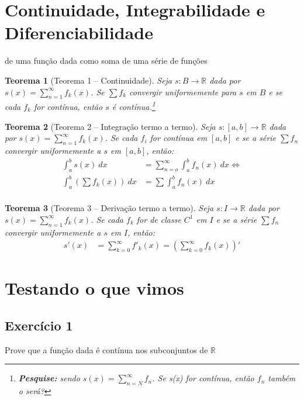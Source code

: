 \documentclass[12pt,openany]{book}
\newtheorem{theorem}{Teorema}[section]
\newcommand{\soma}[2][n]{\sum_{{#1} = #2}^\infty}
\newcommand{\defini}[3][\mathds{R}]{#2: #3 \rightarrow {#1}}
\newcommand{\E}[1]{Exercício #1}
\begin{document}
 \section{Continuidade, Integrabilidade e Diferenciabilidade} {de uma função dada como soma de uma série de funções}
 
\begin{theorem}[Teorema 1 -- Continuidade] \label{T1 C4}
 Seja $\defini{s}{B}$ dada por $s(x) = \displaystyle{\soma{1} f_k(x)} $. Se $\sum f_k$ convergir uniformemente para $s$ em $B$ e se cada $f_k$ for contínua, então $s$ é contínua.\footnote{\textbf{Pesquise:} sendo $s(x) = \soma{N} f_n$. Se s(x) for contínua, então $f_n$ também o será?}
 \end{theorem}
 
\begin{theorem}[Teorema 2 -- Integração termo a termo] \label{T2 C4}
Seja $\defini{s}{[a,b]}$ dada por $s(x) = \displaystyle{\soma{1} f_k(x)}$. Se cada $f_i$ for contínua em $[a,b]$ e se a série $\sum f_n$ convergir uniformemente a $s$ em $[a,b]$, então: \begin{align*}
\int_a^b  s(x) \ dx &= \soma{o} \int_a^b  f_n(x) \ dx  \Longleftrightarrow\\
\int_a^b \left( \sum f_k(x)\right) \ dx &= \sum \int_a^b  f_n(x) \ dx \\
\end{align*}

\end{theorem}

\begin{theorem}[Teorema 3 -- Derivação termo a termo] \label{T3 C4}
Seja $\defini{s}{I}$ dada por $s(x) = \displaystyle{\soma{1} f_k(x)} $. Se cada $f_k$ for de classe $C^1$ em $I$ e se a série $\sum f_n$ convergir uniformemente a $s$ em $I$, então: \begin{align*}
s'(x) &= \soma[k]{0} f'_k(x) = \left( \soma[k]{0} f_k(x)\right)'
\end{align*}
\end{theorem}

\section{Testando o que vimos}

\subsection*{\E{1}} {Prove que a função dada é contínua nos subconjuntos de $\mathds{R}$} 
\end{document}
